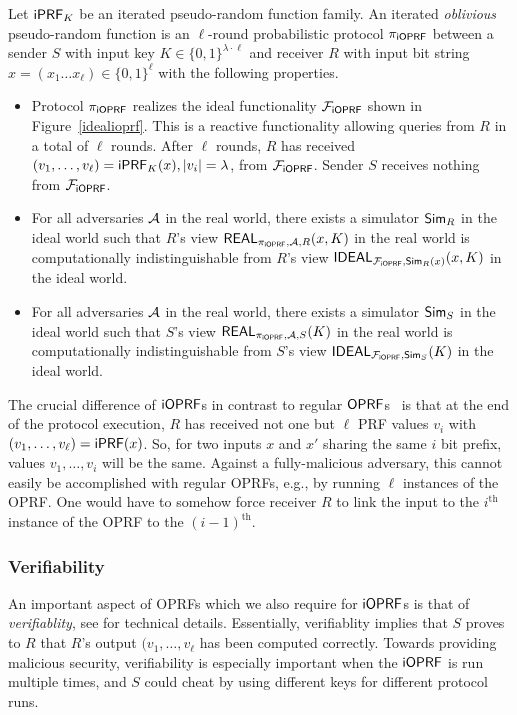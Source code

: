 \begin{definition}[$\proto$]
  Let $\mathsf{i}\mathsf{PRF}_K$ be an iterated pseudo-random function family.  An
  iterated \emph{oblivious} pseudo-random function is an $\ell$-round
  probabilistic protocol $\proto$ between a sender $S$ with input key
  $K\in\{0,1\}^{\lambda\cdot\ell}$ and receiver $R$ with input bit
  string $x=(x_1\ldots{}x_\ell)\in\{0,1\}^{\ell}$ with the following
  properties.

  \begin{itemize}
   
  \item Protocol $\proto$ realizes the ideal functionality $\mathcal{F}_{\mathsf{i}\mathsf{OPRF}}$
    shown in Figure~\ref{idealioprf}. This is a reactive functionality
    allowing queries from $R$ in a total of $\ell$ rounds.  After
    $\ell$ rounds, $R$ has received
    $(v_1,\ldots,v_\ell)=\mathsf{i}\mathsf{PRF}_K(x),|v_i|=\lambda$, from
    $\mathcal{F}_{\mathsf{i}\mathsf{OPRF}}$. Sender $S$ receives nothing from $\mathcal{F}_{\mathsf{i}\mathsf{OPRF}}$.
  
  \item For all adversaries ${\mathcal{A}}$ in the real world, there exists a
    simulator ${\mathsf{Sim}}_R$ in the ideal world such that $R$'s view
    $\mathsf{REAL}_{{\pi_{\mathsf{i}\mathsf{OPRF}}},{\mathcal{A}},R}(x,K)$ in the real world is
    computationally indistinguishable from $R$'s view
    $\mathsf{IDEAL}_{\mathcal{F}_{\mathsf{i}\mathsf{OPRF}},{\mathsf{Sim}}_R(x)}(x,K)$ in the ideal world.

  \item For all adversaries ${\mathcal{A}}$ in the real world, there exists a
    simulator ${\mathsf{Sim}}_S$ in the ideal world such that $S$'s view
    $\mathsf{REAL}_{{\pi_{\mathsf{i}\mathsf{OPRF}}},{\mathcal{A}},S}(K)$ in the real world is
    computationally indistinguishable from $S$'s view
    $\mathsf{IDEAL}_{\mathcal{F}_{\mathsf{i}\mathsf{OPRF}},{\mathsf{Sim}}_S}(K)$ in the ideal world.
\end{itemize}
\end{definition}

The crucial difference of $\mathsf{i}\mathsf{OPRF}$s in contrast to regular
$\mathsf{OPRF}$s~\cite{oprf,stan,chase,koles,boneh,kia} is that at the end of
the protocol execution, $R$ has received not one but $\ell$ PRF values
$v_i$ with $(v_1,\ldots,v_\ell)=\mathsf{i}\mathsf{PRF}(x)$. So, for two inputs $x$ and
$x'$ sharing the same $i$ bit prefix, values $v_1,\ldots,v_i$ will be
the same. Against a fully-malicious adversary, this cannot easily be
accomplished with regular OPRFs, e.g., by running $\ell$ instances of
the OPRF. One would have to somehow force receiver $R$ to link the
input to the $i^\text{th}$ instance of the OPRF to the
$(i-1)^\text{th}$.

\subsubsection{Verifiability}
An important aspect of OPRFs which we also require for $\mathsf{i}\mathsf{OPRF}$s is
that of \emph{verifiablity}, see \citet{kia} for technical
details. Essentially, verifiablity implies that $S$ proves to $R$ that
$R$'s output $(v_1,\ldots,v_\ell$ has been computed correctly. Towards
providing malicious security, verifiability is especially important
when the $\mathsf{i}\mathsf{OPRF}$ is run multiple times, and $S$ could cheat by using
different keys for different protocol runs.


